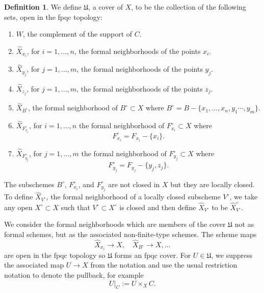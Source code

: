 \documentclass[12pt]{amsart}
\theoremstyle{definition}
\newtheorem{definition}[theorem]{Definition}
\newcommand{\Xhat}{\widehat{X}}
\begin{document}
\begin{definition}\label{defn: the fpqc cover mathfrak U}
We define $\mathfrak{U}$, a cover of $X$, to be the collection of the
following sets, open in the fpqc topology:\begin{enumerate}
\item $W$, the complement of the support of $C$.
\item $\Xhat_{x_{i}}$, for $i=1,\dotsc ,n$, the formal neighborhoods
of the points $x_{i}$.
\item $\Xhat_{y_{j}}$, for $j=1,\dotsc ,m$, the formal neighborhoods
of the points $y_{j}$.
\item $\Xhat_{z_{j}}$, for $j=1,\dotsc ,m$, the formal neighborhoods
of the points $z_{j}$.
\item $\Xhat_{B^{\circ}}$, the formal neighborhood of
$B^{\circ}\subset X$ where $B^{\circ}=B-\{x_{1},\dotsc
,x_{n},y_{1}\dotsb ,y_{m} \}$. 
\item $\Xhat_{F_{x_{i}}^{\circ}}$, for $i=1,\dotsc ,n$ the formal neighborhood of
$F_{x_{i}}^{\circ}\subset X$ where 
\[
F_{x_{i}}^{\circ}=F_{x_{i}}-\{x_{i} \}.
\]
\item $\Xhat_{F_{y_{j}}^{\circ}}$, for $j=1,\dotsc ,m$ the formal neighborhood of
$F_{y_{j}}^{\circ}\subset X$ where 
\[
F_{y_{j}}^{\circ}=F_{y_{j}}-\{y_{j},z_{j} \}.
\]
\end{enumerate}
\end{definition}

The subschemes $B^{\circ}$, $F_{x_{i}}^{\circ}$, and
$F_{y_{j}}^{\circ}$ are not closed in $X$ but they are locally
closed. To define $\Xhat_{V^{\circ}}$, the formal neighborhood of a
locally closed subscheme $V^{\circ}$, we take any open
$X^{\circ}\subset X$ such that $V^{\circ}\subset X^{\circ}$ is closed
and then define $\Xhat_{V^{\circ}}$ to be $\Xhat^{\circ}_{V^{\circ}}$.

We consider the formal neighborhoods which are members of the cover
$\mathfrak{U}$ not as formal schemes, but as the associated
non-finite-type schemes. The scheme maps
\[
\Xhat_{x_{i}}\to X, \quad \Xhat_{B^{\circ}}\to X, \dotsc 
\]
are open in the fpqc topology \cite[Tag 0BNH,
c.f.~Ex.50.15.3(5)]{stacks-project} so $\mathfrak{U}$ forms an fpqc
cover. For $U\in \mathfrak{U}$, we suppress the associated map $U\to
X$ from the notation and use the usual restriction notation to denote
the pullback, for example
\[
U|_{C}:=U\times_{X}C. 
\]
\end{document}
